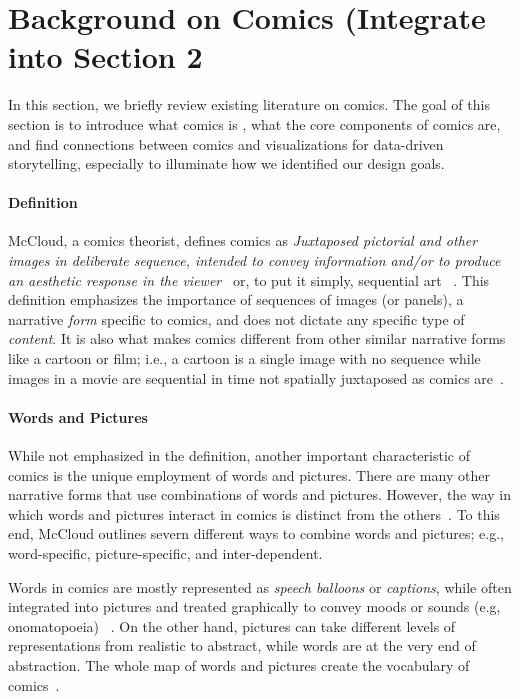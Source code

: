 \section{Background on Comics (Integrate into Section 2}
\label{sec:background}

In this section, we briefly review existing literature on comics. The goal of this section is to introduce what comics is , what the core components of comics are, and find connections between comics and visualizations for data-driven storytelling, especially to illuminate how we identified our design goals.

\paragraph{Definition} 

McCloud, a comics theorist, defines comics as \textit{Juxtaposed pictorial and other images in deliberate sequence, intended to convey information and/or to produce an aesthetic response in the viewer}~\cite{mccloud1993understanding} or, to put it simply, sequential art ~\cite{mccloud1993understanding,eisner2008comics}. This definition emphasizes the importance of sequences of images (or panels), a narrative \textit{form} specific to comics, and does not dictate any specific type of \textit{content}. It is also what makes comics different from other similar narrative forms like a cartoon or film; i.e., a cartoon is a single image with no sequence while images in a movie are sequential in time not spatially juxtaposed as comics are~\cite{mccloud1993understanding,groensteen2007system}. 


\paragraph{Words and Pictures}

While not emphasized in the definition, another important characteristic of comics is the unique employment of words and pictures. There are many other narrative forms that use combinations of words and pictures. However, the way in which words and pictures interact in comics is distinct from the others~\cite{saraceni2003language}. To this end, McCloud outlines severn different ways to combine words and pictures; e.g., word-specific, picture-specific, and inter-dependent. 

Words in comics are mostly represented as \textit{speech balloons} or \textit{captions}, while often integrated into pictures and treated graphically to convey moods or sounds (e.g, onomatopoeia) ~\cite{eisner2008comics}. On the other hand, pictures can take different levels of representations from realistic to abstract, while words are at the very end of abstraction. The whole map of words and pictures create the vocabulary of comics~\cite{mccloud1993understanding}.

